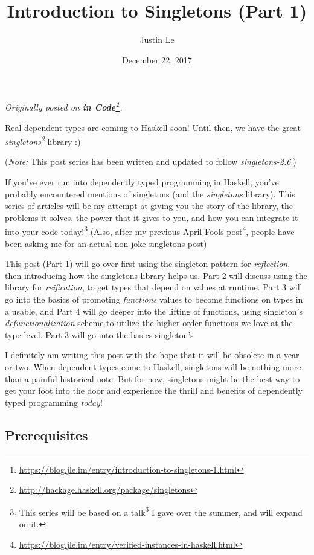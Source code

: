 \documentclass[]{article}
\title{Introduction to Singletons (Part 1)}
\author{Justin Le}
\date{December 22, 2017}
\renewcommand{\href}[2]{#2\footnote{\url{#1}}}
\begin{document}
\maketitle

\emph{Originally posted on
\textbf{\href{https://blog.jle.im/entry/introduction-to-singletons-1.html}{in
Code}}.}

Real dependent types are coming to Haskell soon! Until then, we have the great
\emph{\href{http://hackage.haskell.org/package/singletons}{singletons}} library
:)

(\emph{Note:} This post series has been written and updated to follow
\emph{singletons-2.6}.)

If you've ever run into dependently typed programming in Haskell, you've
probably encountered mentions of singletons (and the \emph{singletons} library).
This series of articles will be my attempt at giving you the story of the
library, the problems it solves, the power that it gives to you, and how you can
integrate it into your code today!\footnote{This series will be based on
  \href{http://talks.jle.im/lambdaconf-2017/singletons/}{a talk} I gave over the
  summer, and will expand on it.} (Also, after
\href{https://blog.jle.im/entry/verified-instances-in-haskell.html}{my previous
April Fools post}, people have been asking me for an actual non-joke singletons
post)

This post (Part 1) will go over first using the singleton pattern for
\emph{reflection}, then introducing how the singletons library helps us. Part 2
will discuss using the library for \emph{reification}, to get types that depend
on values at runtime. Part 3 will go into the basics of promoting
\emph{functions} values to become functions on types in a usable, and Part 4
will go deeper into the lifting of functions, using singleton's
\emph{defunctionalization} scheme to utilize the higher-order functions we love
at the type level. Part 3 will go into the basics singleton's

I definitely am writing this post with the hope that it will be obsolete in a
year or two. When dependent types come to Haskell, singletons will be nothing
more than a painful historical note. But for now, singletons might be the best
way to get your foot into the door and experience the thrill and benefits of
dependently typed programming \emph{today}!

\hypertarget{prerequisites}{%
\subsection{Prerequisites}\label{prerequisites}}
\end{document}
